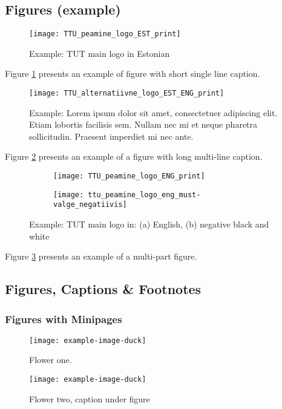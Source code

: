 \subsection{Figures (example)}


\begin{figure}[!ht]
  \centering
  \texttt{[image: TTU\_peamine\_logo\_EST\_print]}
  \caption{ Example: TUT main logo in Estonian}
  \label{fig:logo}
\end{figure}

Figure \ref{fig:logo} presents an example of figure with short single
line caption.

\begin{figure}[!ht]
  \centering
  \texttt{[image: TTU\_alternatiivne\_logo\_EST\_ENG\_print]}
  \caption{Example: Lorem ipsum dolor sit amet, consectetuer
    adipiscing elit. Etiam lobortis facilisis sem. Nullam nec mi et
    neque pharetra sollicitudin. Praesent imperdiet mi nec ante.
  }
  \label{fig:logo2}
\end{figure}

Figure \ref{fig:logo2} presents an example of a figure with long multi-line caption.


\begin{figure}[!ht]
  \centering
  \begin{subfigure}[b]{0.45\textwidth}
    \texttt{[image: TTU\_peamine\_logo\_ENG\_print]}
    \caption{}
  \end{subfigure}
  \hfill
  \begin{subfigure}[b]{0.45\textwidth}
    \texttt{[image: ttu\_peamine\_logo\_eng\_must-valge\_negatiivis]}
    \caption{}
  \end{subfigure}
  \caption{Example: TUT main logo in: (a) English, (b) negative black and white}
  \label{fig:logo3}
\end{figure}

Figure \ref{fig:logo3} presents an example of a multi-part figure.


\FloatBarrier
\subsection{Figures, Captions \& Footnotes}
\subsubsection{Figures with Minipages}
\begin{figure}[H]
	\centering
	\begin{minipage}[b]{0.4\textwidth}
		\texttt{[image: example-image-duck]}
		\caption{Flower one.}
	\end{minipage}
	\hfill
	\begin{minipage}[b]{0.4\textwidth}
		\texttt{[image: example-image-duck]}
		\caption[Flower two, caption in list of figures]{Flower two, caption under figure}
	\end{minipage}
\end{figure}

